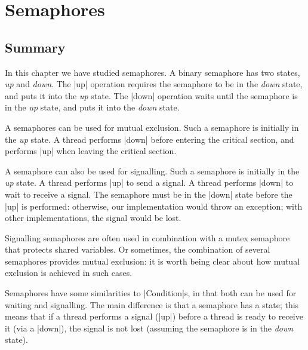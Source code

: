 \chapter{Semaphores} 
\label{chap:semaphores}

% 



\section{Summary}

In this chapter we have studied semaphores.  A binary semaphore has two
states, \emph{up} and \emph{down}.  The |up| operation requires the semaphore
to be in the \emph{down} state, and puts it into the \emph{up} state.  The
|down| operation waits until the semaphore is in the \emph{up} state, and puts
it into the \emph{down} state. 

A semaphores can be used for mutual exclusion.  Such a semaphore is initially
in the \emph{up} state.  A thread performs |down| before entering the critical
section, and performs |up| when leaving the critical section.

A semaphore can also be used for signalling.  Such a semaphore is initially in
the \emph{up} state.  A thread performs |up| to send a signal.  A thread
performs |down| to wait to receive a signal.  The semaphore must be in the
|down| state before the |up| is performed: otherwise, our implementation would
throw an exception; with other implementations, the signal would be lost.

Signalling semaphores are often used in combination with a mutex semaphore
that protects shared variables.  Or sometimes, the combination of several
semaphores provides mutual exclusion: it is worth being clear about how mutual
exclusion is achieved in such cases.

Semaphores have some similarities to |Condition|s, in that both can be used
for waiting and signalling.  The main difference is that a semaphore has a
state; this means that if a thread performs a signal (|up|) before a thread is
ready to receive it (via a |down|), the signal is not lost (assuming the
semaphore is in the \emph{down} state).

